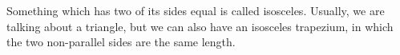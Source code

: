 Something which has two of its sides equal is called isosceles.
Usually, we are talking about a triangle, but we can also have an
isosceles trapezium, in which the two non-parallel sides are the same length.